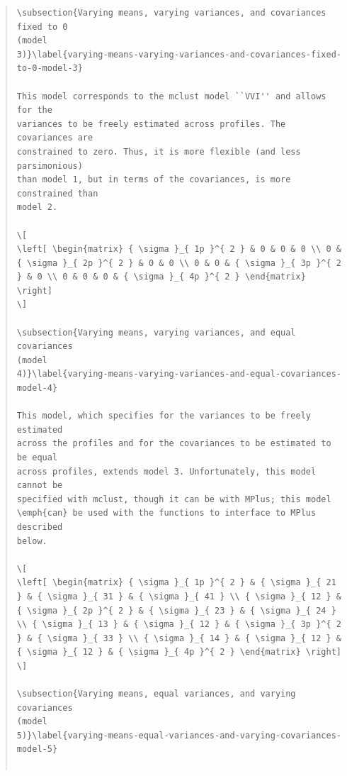 \documentclass[]{msu-thesis}
\theoremstyle{definition}
\theoremstyle{definition}
\theoremstyle{definition}
\theoremstyle{remark}
\begin{document}
\begin{quote}
\begin{lstlisting}
\subsection{Varying means, varying variances, and covariances fixed to 0
(model
3)}\label{varying-means-varying-variances-and-covariances-fixed-to-0-model-3}

This model corresponds to the mclust model ``VVI'' and allows for the
variances to be freely estimated across profiles. The covariances are
constrained to zero. Thus, it is more flexible (and less parsimonious)
than model 1, but in terms of the covariances, is more constrained than
model 2.

\[
\left[ \begin{matrix} { \sigma }_{ 1p }^{ 2 } & 0 & 0 & 0 \\ 0 & { \sigma }_{ 2p }^{ 2 } & 0 & 0 \\ 0 & 0 & { \sigma }_{ 3p }^{ 2 } & 0 \\ 0 & 0 & 0 & { \sigma }_{ 4p }^{ 2 } \end{matrix} \right]
\]

\subsection{Varying means, varying variances, and equal covariances
(model
4)}\label{varying-means-varying-variances-and-equal-covariances-model-4}

This model, which specifies for the variances to be freely estimated
across the profiles and for the covariances to be estimated to be equal
across profiles, extends model 3. Unfortunately, this model cannot be
specified with mclust, though it can be with MPlus; this model
\emph{can} be used with the functions to interface to MPlus described
below.

\[
\left[ \begin{matrix} { \sigma }_{ 1p }^{ 2 } & { \sigma }_{ 21 } & { \sigma }_{ 31 } & { \sigma }_{ 41 } \\ { \sigma }_{ 12 } & { \sigma }_{ 2p }^{ 2 } & { \sigma }_{ 23 } & { \sigma }_{ 24 } \\ { \sigma }_{ 13 } & { \sigma }_{ 12 } & { \sigma }_{ 3p }^{ 2 } & { \sigma }_{ 33 } \\ { \sigma }_{ 14 } & { \sigma }_{ 12 } & { \sigma }_{ 12 } & { \sigma }_{ 4p }^{ 2 } \end{matrix} \right]
\]

\subsection{Varying means, equal variances, and varying covariances
(model
5)}\label{varying-means-equal-variances-and-varying-covariances-model-5}


\end{lstlisting}
\end{quote}
\end{document}
